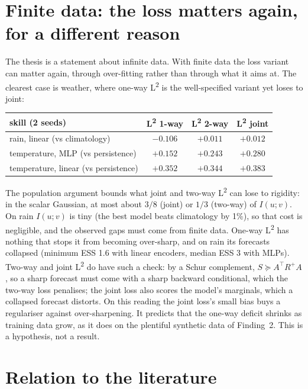 \documentclass[11pt]{article}
\newcommand{\Ltwo}{L\textsuperscript{2}}
\theoremstyle{plain}
\theoremstyle{definition}
\theoremstyle{remark}
\begin{document}
\section{Finite data: the loss matters again, for a different reason}\label{sec:finite}

The thesis is a statement about infinite data. With finite data the loss variant can matter
again, through over-fitting rather than through what it aims at. The clearest case is
weather, where one-way \Ltwo{} is the well-specified variant yet loses to joint:
\begin{center}\small
\begin{tabular}{@{}lccc@{}}
\toprule
skill (2 seeds) & \Ltwo{} 1-way & \Ltwo{} 2-way & \Ltwo{} joint \\
\midrule
rain, linear (vs climatology) & $-0.106$ & $+0.011$ & $+0.012$ \\
temperature, MLP (vs persistence) & $+0.152$ & $+0.243$ & $+0.280$ \\
temperature, linear (vs persistence) & $+0.352$ & $+0.344$ & $+0.383$ \\
\bottomrule
\end{tabular}
\end{center}
The population argument bounds what joint and two-way \Ltwo{} can lose to rigidity: in the
scalar Gaussian, at most about $3/8$ (joint) or $1/3$ (two-way) of $I(u;v)$. On rain $I(u;v)$
is tiny (the best model beats climatology by 1\%), so that cost is negligible, and the
observed gaps must come from finite data. One-way \Ltwo{} has nothing that stops it from
becoming over-sharp, and on rain its forecasts collapsed (minimum ESS 1.6 with linear
encoders, median ESS 3 with MLPs). Two-way and joint \Ltwo{} do have such a check: by a Schur
complement, $S\succeq A^\top R^{+}A$, so a sharp forecast must come with a sharp backward
conditional, which the two-way loss penalises; the joint loss also scores the model's
marginals, which a collapsed forecast distorts. On this reading the joint loss's small bias
buys a regulariser against over-sharpening. It predicts that the one-way deficit shrinks as
training data grow, as it does on the plentiful synthetic data of Finding~2. This is a
hypothesis, not a result.

\section{Relation to the literature}\label{sec:lit}
\end{document}

